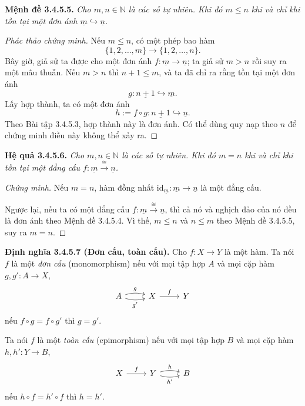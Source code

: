 \noindent\textbf{Mệnh đề 3.4.5.5.} \emph{Cho $m,n\in\mathbb N$ là các số tự nhiên. Khi đó $m\le n$ khi và chỉ khi tồn tại một đơn ánh $\underline m\hookrightarrow\underline n$.}
\begin{proof}[Phác thảo chứng minh]
Nếu $m\le n$, có một phép bao hàm
\[\{1,2,\ldots,m\}\to\{1,2,\ldots,n\}.\]
Bây giờ, giả sử ta được cho một đơn ánh $f:\underline m\to\underline n$; ta giả sử $m>n$ rồi suy ra một
mâu thuẫn. Nếu $m>n$ thì $n+1\le m$, và ta đã chỉ ra rằng tồn tại một đơn ánh
\[g:\underline{n+1}\hookrightarrow\underline m.\]
Lấy hợp thành, ta có một đơn ánh
\[h:=f\circ g:\underline{n+1}\hookrightarrow\underline n.\]
Theo Bài tập 3.4.5.3, hợp thành này là đơn ánh. Có thể dùng quy nạp theo $n$ để chứng minh điều này không thể xảy ra.
\end{proof}

\noindent\textbf{Hệ quả 3.4.5.6.} \emph{Cho $m,n\in\mathbb N$ là các số tự nhiên. Khi đó $m=n$ khi và chỉ khi tồn tại một đẳng cấu $f:\underline m\xrightarrow{\cong}\underline n$.}
\begin{proof}[Chứng minh]
Nếu $m=n$, hàm đồng nhất $\mathrm{id}_{\underline m}:\underline m\to\underline n$ là một đẳng cấu.

Ngược lại, nếu ta có một đẳng cấu $f:\underline m\xrightarrow{\cong}\underline n$, thì cả nó và nghịch đảo của nó đều là đơn ánh theo Mệnh đề 3.4.5.4. Vì thế, $m\le n$ và $n\le m$ theo Mệnh đề 3.4.5.5, suy ra $m=n$.
\end{proof}

\noindent\textbf{Định nghĩa 3.4.5.7 (Đơn cấu, toàn cấu).} Cho $f:X\to Y$ là một hàm. Ta nói $f$ là một \emph{đơn cấu} (monomorphism) nếu với mọi tập hợp $A$ và mọi cặp hàm $g,g':A\to X$,
\[\begin{tikzcd}A\arrow[r,bend left=15,"g"]\arrow[r,bend right=15,"g'"']&X\arrow[r,"f"]&Y\end{tikzcd}\]
nếu $f\circ g=f\circ g'$ thì $g=g'$.

Ta nói $f$ là một \emph{toàn cấu} (epimorphism) nếu với mọi tập hợp $B$ và mọi cặp hàm $h,h':Y\to B$,
\[\begin{tikzcd}X\arrow[r,"f"]&Y\arrow[r,bend left=15,"h"]\arrow[r,bend right=15,"h'"']&B\end{tikzcd}\]
nếu $h\circ f=h'\circ f$ thì $h=h'$.

